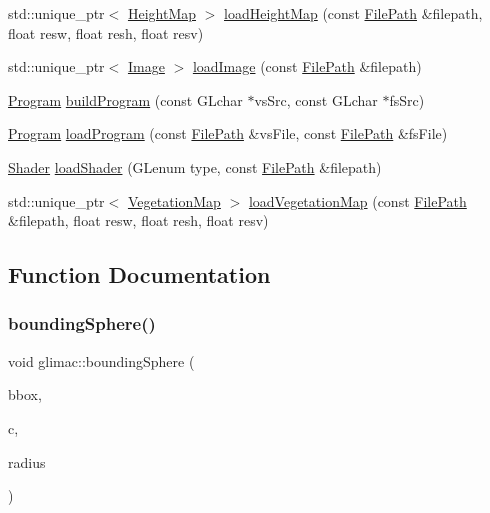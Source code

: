 \begin{DoxyCompactItemize}
\item 
std\+::unique\+\_\+ptr$<$ \hyperlink{classglimac_1_1_height_map}{Height\+Map} $>$ \hyperlink{namespaceglimac_a038eee46080d83df2dc565cad9dbf76c}{load\+Height\+Map} (const \hyperlink{classglimac_1_1_file_path}{File\+Path} \&filepath, float resw, float resh, float resv)
\item 
std\+::unique\+\_\+ptr$<$ \hyperlink{classglimac_1_1_image}{Image} $>$ \hyperlink{namespaceglimac_a7d92f451f5235a3299fa0faef1a335f5}{load\+Image} (const \hyperlink{classglimac_1_1_file_path}{File\+Path} \&filepath)
\item 
\hyperlink{classglimac_1_1_program}{Program} \hyperlink{namespaceglimac_a3d534d78277f9bab3c4fa83f263f3633}{build\+Program} (const G\+Lchar $\ast$vs\+Src, const G\+Lchar $\ast$fs\+Src)
\item 
\hyperlink{classglimac_1_1_program}{Program} \hyperlink{namespaceglimac_a9c42759cac55f7ef947d2972b19e18a6}{load\+Program} (const \hyperlink{classglimac_1_1_file_path}{File\+Path} \&vs\+File, const \hyperlink{classglimac_1_1_file_path}{File\+Path} \&fs\+File)
\item 
\hyperlink{classglimac_1_1_shader}{Shader} \hyperlink{namespaceglimac_aa154f6bbc6caafaa2b8aa5e4dc433523}{load\+Shader} (G\+Lenum type, const \hyperlink{classglimac_1_1_file_path}{File\+Path} \&filepath)
\item 
std\+::unique\+\_\+ptr$<$ \hyperlink{classglimac_1_1_vegetation_map}{Vegetation\+Map} $>$ \hyperlink{namespaceglimac_a4c2b19dc96ee574591cea4130d5a41c6}{load\+Vegetation\+Map} (const \hyperlink{classglimac_1_1_file_path}{File\+Path} \&filepath, float resw, float resh, float resv)
\end{DoxyCompactItemize}


\subsection{Function Documentation}
\mbox{\label{namespaceglimac_aa47b0f2b0b1ef75335813a7e06f33d0b}} 
\subsubsection{\texorpdfstring{bounding\+Sphere()}{boundingSphere()}}
{\footnotesize\ttfamily void glimac\+::bounding\+Sphere (\begin{DoxyParamCaption}\item[{const \hyperlink{structglimac_1_1_b_box3f}{B\+Box3f} \&}]{bbox,  }\item[{\hyperlink{group__core__types_ga1c47e8b3386109bc992b6c48e91b0be7}{glm\+::vec3} \&}]{c,  }\item[{float \&}]{radius }\end{DoxyParamCaption})\hspace{0.3cm}{\ttfamily [inline]}}



